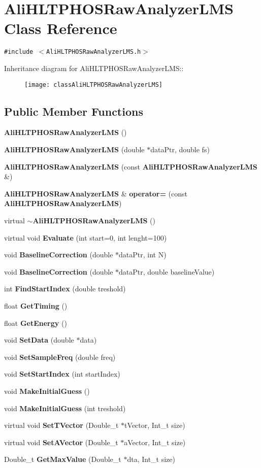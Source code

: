 \section{Ali\-HLTPHOSRaw\-Analyzer\-LMS Class Reference}
\label{classAliHLTPHOSRawAnalyzerLMS}
{\tt \#include $<$Ali\-HLTPHOSRaw\-Analyzer\-LMS.h$>$}

Inheritance diagram for Ali\-HLTPHOSRaw\-Analyzer\-LMS::\begin{figure}[H]
\begin{center}
\leavevmode
\texttt{[image: classAliHLTPHOSRawAnalyzerLMS]}
\end{center}
\end{figure}
\subsection*{Public Member Functions}
\begin{CompactItemize}
\item 
{\bf Ali\-HLTPHOSRaw\-Analyzer\-LMS} ()
\item 
{\bf Ali\-HLTPHOSRaw\-Analyzer\-LMS} (double $\ast$data\-Ptr, double fs)
\item 
{\bf Ali\-HLTPHOSRaw\-Analyzer\-LMS} (const {\bf Ali\-HLTPHOSRaw\-Analyzer\-LMS} \&)
\item 
{\bf Ali\-HLTPHOSRaw\-Analyzer\-LMS} \& {\bf operator=} (const {\bf Ali\-HLTPHOSRaw\-Analyzer\-LMS})
\item 
virtual {\bf $\sim$Ali\-HLTPHOSRaw\-Analyzer\-LMS} ()
\item 
virtual void {\bf Evaluate} (int start=0, int lenght=100)
\item 
void {\bf Baseline\-Correction} (double $\ast$data\-Ptr, int N)
\item 
void {\bf Baseline\-Correction} (double $\ast$data\-Ptr, double baseline\-Value)
\item 
int {\bf Find\-Start\-Index} (double treshold)
\item 
float {\bf Get\-Timing} ()
\item 
float {\bf Get\-Energy} ()
\item 
void {\bf Set\-Data} (double $\ast$data)
\item 
void {\bf Set\-Sample\-Freq} (double freq)
\item 
void {\bf Set\-Start\-Index} (int start\-Index)
\item 
void {\bf Make\-Initial\-Guess} ()
\item 
void {\bf Make\-Initial\-Guess} (int treshold)
\item 
virtual void {\bf Set\-TVector} (Double\_\-t $\ast$t\-Vector, Int\_\-t size)
\item 
virtual void {\bf Set\-AVector} (Double\_\-t $\ast$a\-Vector, Int\_\-t size)
\item 
Double\_\-t {\bf Get\-Max\-Value} (Double\_\-t $\ast$dta, Int\_\-t size)
\end{CompactItemize}
